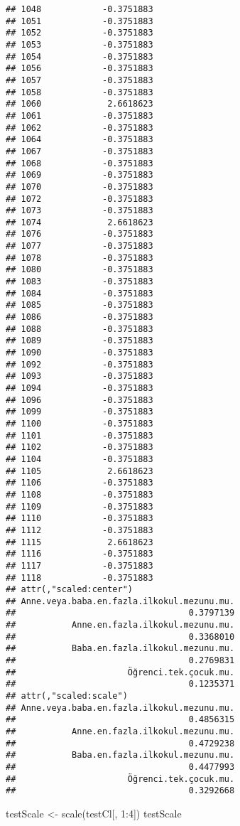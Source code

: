 \documentclass[
]{article}
\newenvironment{Shaded}{\begin{snugshade}}{\end{snugshade}}
\newcommand{\DecValTok}[1]{\textcolor[rgb]{0.00,0.00,0.81}{#1}}
\newcommand{\FunctionTok}[1]{\textcolor[rgb]{0.00,0.00,0.00}{#1}}
\newcommand{\NormalTok}[1]{#1}
\newcommand{\OtherTok}[1]{\textcolor[rgb]{0.56,0.35,0.01}{#1}}
\newcommand{\SpecialCharTok}[1]{\textcolor[rgb]{0.00,0.00,0.00}{#1}}
\begin{document}
\begin{verbatim}
## 1048            -0.3751883
## 1051            -0.3751883
## 1052            -0.3751883
## 1053            -0.3751883
## 1054            -0.3751883
## 1056            -0.3751883
## 1057            -0.3751883
## 1058            -0.3751883
## 1060             2.6618623
## 1061            -0.3751883
## 1062            -0.3751883
## 1064            -0.3751883
## 1067            -0.3751883
## 1068            -0.3751883
## 1069            -0.3751883
## 1070            -0.3751883
## 1072            -0.3751883
## 1073            -0.3751883
## 1074             2.6618623
## 1076            -0.3751883
## 1077            -0.3751883
## 1078            -0.3751883
## 1080            -0.3751883
## 1083            -0.3751883
## 1084            -0.3751883
## 1085            -0.3751883
## 1086            -0.3751883
## 1088            -0.3751883
## 1089            -0.3751883
## 1090            -0.3751883
## 1092            -0.3751883
## 1093            -0.3751883
## 1094            -0.3751883
## 1096            -0.3751883
## 1099            -0.3751883
## 1100            -0.3751883
## 1101            -0.3751883
## 1102            -0.3751883
## 1104            -0.3751883
## 1105             2.6618623
## 1106            -0.3751883
## 1108            -0.3751883
## 1109            -0.3751883
## 1110            -0.3751883
## 1112            -0.3751883
## 1115             2.6618623
## 1116            -0.3751883
## 1117            -0.3751883
## 1118            -0.3751883
## attr(,"scaled:center")
## Anne.veya.baba.en.fazla.ilkokul.mezunu.mu. 
##                                  0.3797139 
##           Anne.en.fazla.ilkokul.mezunu.mu. 
##                                  0.3368010 
##           Baba.en.fazla.ilkokul.mezunu.mu. 
##                                  0.2769831 
##                      Öğrenci.tek.çocuk.mu. 
##                                  0.1235371 
## attr(,"scaled:scale")
## Anne.veya.baba.en.fazla.ilkokul.mezunu.mu. 
##                                  0.4856315 
##           Anne.en.fazla.ilkokul.mezunu.mu. 
##                                  0.4729238 
##           Baba.en.fazla.ilkokul.mezunu.mu. 
##                                  0.4477993 
##                      Öğrenci.tek.çocuk.mu. 
##                                  0.3292668
\end{verbatim}

\begin{Shaded}
\begin{Highlighting}[]
\NormalTok{testScale }\OtherTok{\textless{}{-}} \FunctionTok{scale}\NormalTok{(testCl[, }\DecValTok{1}\SpecialCharTok{:}\DecValTok{4}\NormalTok{])}
\NormalTok{testScale}
\end{Highlighting}
\end{Shaded}
\end{document}
